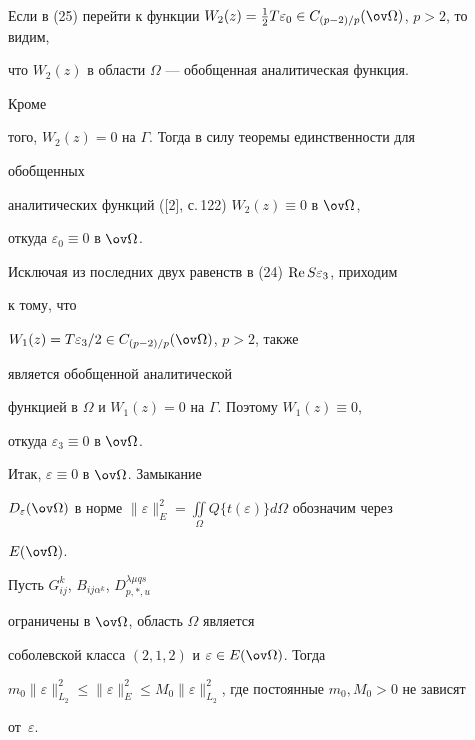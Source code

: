 Если в (25) перейти к функции $W_2(z)=\frac{1}{2}T \varepsilon_0\in 


C_{(p-2)/p}(\ov\Omega)$, $p>2$, то видим, 


что $W_2(z)$ в области $\Omega$ --- обобщенная аналитическая функция. 


Кроме 


того, $W_2(z)=0$ на $\Gamma$. Тогда в силу теоремы единственности для 


обобщенных 


аналитических функций ([2], с.\,122) $W_2(z)\equiv0$ в $\ov\Omega$, 


откуда $\varepsilon_0\equiv0$ в $\ov\Omega$. 


Исключая из последних двух равенств в (24) $\operatorname{Re} S\varepsilon_3$, приходим 


к тому, что 


$W_1(z)=T\varepsilon_3/2\in C_{(p-2)/p}(\ov\Omega)$, $p>2$, также 


является обобщенной аналитической 


функцией в $\Omega$ и $W_1(z)=0$ на $\Gamma$. Поэтому $W_1(z)\equiv0$, 


откуда $\varepsilon_3\equiv0$ в $\ov\Omega$. 


Итак, $\varepsilon\equiv0$ в $\ov\Omega$. Замыкание 


$D_\varepsilon(\ov\Omega)$ в норме $\|\varepsilon\|^2_E= 


\iint\limits_\Omega Q\{t(\varepsilon)\}d\Omega$ обозначим через 


$E(\ov\Omega)$. 


 


 


\begin{thm} 


Пусть $G^k_{ij}$, $B_{ij\alpha^k}$, $D^{\lambda\mu qs}_{p,\ast,u}$ 


ограничены в $\ov\Omega$, область $\Omega$ является 


соболевской класса $(2,1,2)$ и $\varepsilon\in E(\ov\Omega)$. Тогда 


$m_0\|\varepsilon\|^2_{L_2}\le \|\varepsilon\|^2_E\le 


M_0\|\varepsilon\|^2_{L_2}$, где постоянные $m_0,M_0>0$ не зависят


от~$\varepsilon$. 


\end{thm} 





